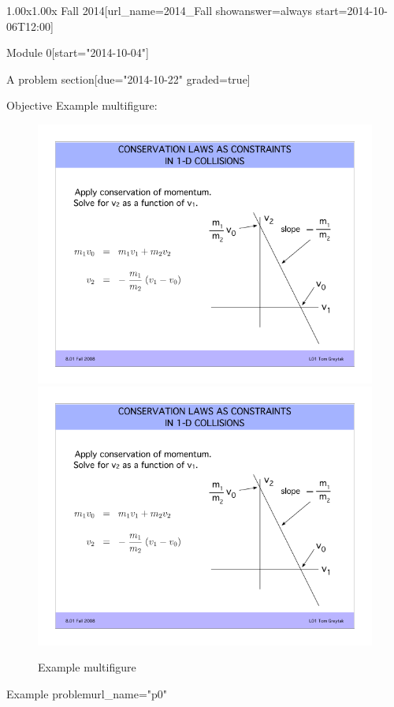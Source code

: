 \documentclass[12pt]{article}
\begin{document}
\begin{edXcourse}{1.00x}{1.00x Fall 2014}[url_name=2014_Fall showanswer=always start=2014-10-06T12:00]
\begin{edXchapter*}{Module 0}[start="2014-10-04"]
\begin{edXsequential}{A problem section}[due="2014-10-22" graded=true]
\begin{edXtext}{Objective}
Example multifigure:
\begin{figure}
  \begin{center}
    \includegraphics{example-image.png}
    \hfill
    \includegraphics{example-image.png}
    \caption{Example multifigure}
    \label{fig:multi}
  \end{center}
\end{figure}

\end{edXtext}

\begin{edXproblem}{Example problem}{url_name="p0"}
  


\end{edXproblem}
\end{edXsequential}
\end{edXchapter*}
\end{edXcourse}
\end{document}
